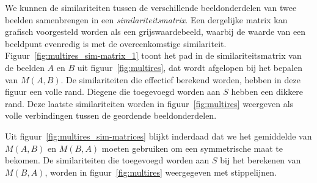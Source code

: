 
We kunnen de similariteiten tussen de verschillende beeldonderdelen van twee beelden
samenbrengen in een \emph{similariteitsmatrix}. Een dergelijke matrix kan grafisch 
voorgesteld worden als een grijswaardebeeld, waarbij de waarde van een beeldpunt evenredig is met
de overeenkomstige similariteit. Figuur~\ref{fig:multires_sim-matrix_1} toont het pad in de 
similariteitsmatrix van de beelden $A$ en $B$ uit figuur~\ref{fig:multires}, dat wordt afgelopen
bij het bepalen van $M(A,B)$.
De similariteiten die effectief berekend worden, hebben in deze figuur een volle rand. Diegene 
die toegevoegd worden aan $S$ hebben een dikkere rand. Deze laatste similariteiten 
worden in figuur~\ref{fig:multires} weergeven als volle verbindingen tussen de
geordende beeldonderdelen. 

Uit figuur~\ref{fig:multires_sim-matrices} blijkt inderdaad dat we
het gemiddelde van $M(A,B)$ en $M(B,A)$ moeten gebruiken om een symmetrische maat te bekomen.
De similariteiten die toegevoegd worden aan $S$ bij het berekenen van $M(B,A)$, worden in 
figuur~\ref{fig:multires} weergegeven met stippelijnen.


